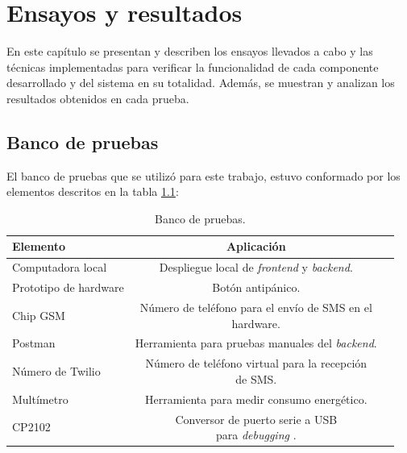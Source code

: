 
\chapter{Ensayos y resultados} %



\label{Chapter4} %

En este capítulo se presentan y describen los ensayos llevados a cabo y las técnicas implementadas para verificar la funcionalidad de cada componente desarrollado y del sistema en su totalidad. Además, se muestran y analizan los resultados obtenidos en cada prueba.


\section{Banco de pruebas}

El banco de pruebas que se utilizó para este trabajo, estuvo conformado por los elementos descritos en la tabla \ref{tab:banco-pruebas}:

\begin{table}[H]
	\centering
	\caption{Banco de pruebas.}
	\begin{tabular}{l c c}    
		\toprule
		\textbf{Elemento} 	 & \textbf{Aplicación} \\
		\midrule
		Computadora local & Despliegue local de \textit{frontend} y \textit{backend}.  \\		
		Prototipo de hardware & Botón antipánico. \\		
		Chip GSM & \makecell{Número de teléfono para el envío de  SMS en el \\ hardware.} \\
		Postman & Herramienta para pruebas manuales del \textit{backend}.\\
		Número de Twilio & \makecell{Número de teléfono virtual para la recepción \\ de SMS.}  \\
		Multímetro & Herramienta para medir consumo energético.  \\
		CP2102 & \makecell{Conversor de puerto serie a USB \\ para \textit{debugging} \citep{CP2102:1}.}\\	
		\bottomrule
		\hline
	\end{tabular}
	\label{tab:banco-pruebas}
\end{table}

